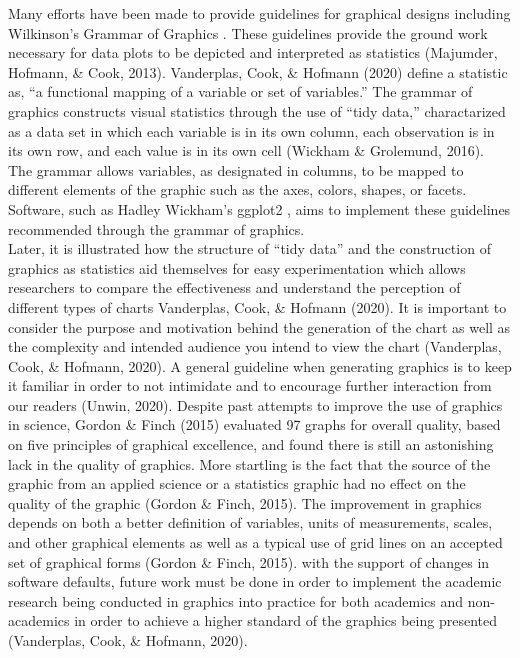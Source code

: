 \documentclass[print]{nuthesis}
\begin{document}
Many efforts have been made to provide guidelines for graphical designs including Wilkinson's Grammar of Graphics .
These guidelines provide the ground work necessary for data plots to be depicted and interpreted as statistics (Majumder, Hofmann, \& Cook, 2013).
Vanderplas, Cook, \& Hofmann (2020) define a statistic as, ``a functional mapping of a variable or set of variables.''
The grammar of graphics constructs visual statistics through the use of ``tidy data,'' charactarized as a data set in which each variable is in its own column, each observation is in its own row, and each value is in its own cell (Wickham \& Grolemund, 2016).
The grammar allows variables, as designated in columns, to be mapped to different elements of the graphic such as the axes, colors, shapes, or facets.
Software, such as Hadley Wickham's ggplot2 , aims to implement these guidelines recommended through the grammar of graphics.\\
Later, it is illustrated how the structure of ``tidy data'' and the construction of graphics as statistics aid themselves for easy experimentation which allows researchers to compare the effectiveness and understand the perception of different types of charts Vanderplas, Cook, \& Hofmann (2020).
It is important to consider the purpose and motivation behind the generation of the chart as well as the complexity and intended audience you intend to view the chart (Vanderplas, Cook, \& Hofmann, 2020).
A general guideline when generating graphics is to keep it familiar in order to not intimidate and to encourage further interaction from our readers (Unwin, 2020).
Despite past attempts to improve the use of graphics in science, Gordon \& Finch (2015) evaluated 97 graphs for overall quality, based on five principles of graphical excellence, and found there is still an astonishing lack in the quality of graphics. More startling is the fact that the source of the graphic from an applied science or a statistics graphic had no effect on the quality of the graphic (Gordon \& Finch, 2015).
The improvement in graphics depends on both a better definition of variables, units of measurements, scales, and other graphical elements as well as a typical use of grid lines on an accepted set of graphical forms (Gordon \& Finch, 2015).
with the support of changes in software defaults, future work must be done in order to implement the academic research being conducted in graphics into practice for both academics and non-academics in order to achieve a higher standard of the graphics being presented (Vanderplas, Cook, \& Hofmann, 2020).
\end{document}
